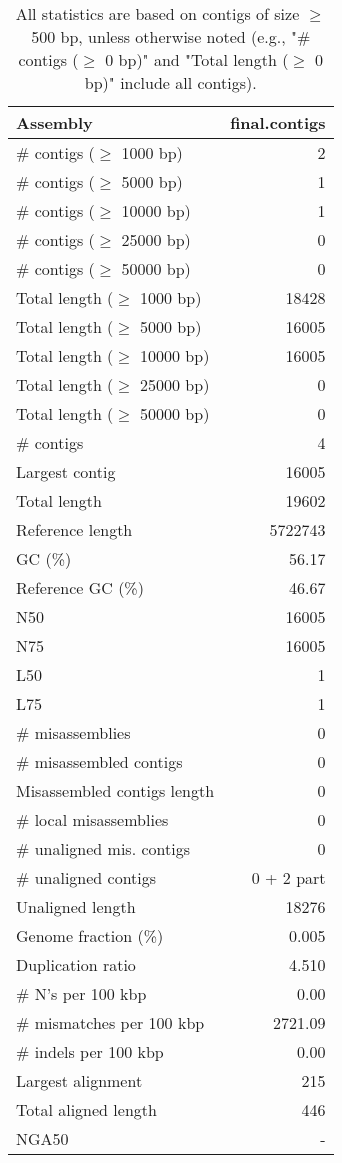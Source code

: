 \documentclass[12pt,a4paper]{article}
\begin{document}
\begin{table}[ht]
\begin{center}
\caption{All statistics are based on contigs of size $\geq$ 500 bp, unless otherwise noted (e.g., "\# contigs ($\geq$ 0 bp)" and "Total length ($\geq$ 0 bp)" include all contigs).}
\begin{tabular}{|l*{1}{|r}|}
\hline
Assembly & final.contigs \\ \hline
\# contigs ($\geq$ 1000 bp) & 2 \\ \hline
\# contigs ($\geq$ 5000 bp) & 1 \\ \hline
\# contigs ($\geq$ 10000 bp) & 1 \\ \hline
\# contigs ($\geq$ 25000 bp) & 0 \\ \hline
\# contigs ($\geq$ 50000 bp) & 0 \\ \hline
Total length ($\geq$ 1000 bp) & 18428 \\ \hline
Total length ($\geq$ 5000 bp) & 16005 \\ \hline
Total length ($\geq$ 10000 bp) & 16005 \\ \hline
Total length ($\geq$ 25000 bp) & 0 \\ \hline
Total length ($\geq$ 50000 bp) & 0 \\ \hline
\# contigs & 4 \\ \hline
Largest contig & 16005 \\ \hline
Total length & 19602 \\ \hline
Reference length & 5722743 \\ \hline
GC (\%) & 56.17 \\ \hline
Reference GC (\%) & 46.67 \\ \hline
N50 & 16005 \\ \hline
N75 & 16005 \\ \hline
L50 & 1 \\ \hline
L75 & 1 \\ \hline
\# misassemblies & 0 \\ \hline
\# misassembled contigs & 0 \\ \hline
Misassembled contigs length & 0 \\ \hline
\# local misassemblies & 0 \\ \hline
\# unaligned mis. contigs & 0 \\ \hline
\# unaligned contigs & 0 + 2 part \\ \hline
Unaligned length & 18276 \\ \hline
Genome fraction (\%) & 0.005 \\ \hline
Duplication ratio & 4.510 \\ \hline
\# N's per 100 kbp & 0.00 \\ \hline
\# mismatches per 100 kbp & 2721.09 \\ \hline
\# indels per 100 kbp & 0.00 \\ \hline
Largest alignment & 215 \\ \hline
Total aligned length & 446 \\ \hline
NGA50 & - \\ \hline
\end{tabular}
\end{center}
\end{table}
\end{document}
